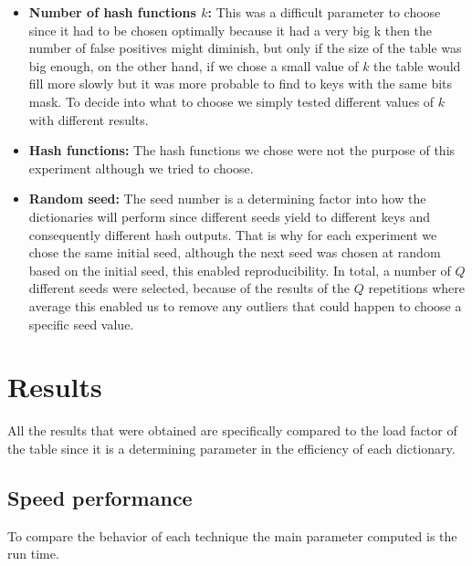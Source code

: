\documentclass{article}
\begin{document}
\begin{itemize}
    \item \textbf{Number of hash functions $k$:}
              This was a difficult parameter to choose since it had to be chosen optimally because it had a very big k then the number of false positives might diminish, but only if the size of the table
             was big enough, on the other hand, if we chose a small value of $k$ the table would fill more slowly but it was more probable to find to keys with the same bits mask. To decide into what to choose 
             we simply tested different values of $k$ with different results. 
             
    \item \textbf{Hash functions:}
            The hash functions we chose were not the purpose of this experiment although we tried to choose. 
            
    \item \textbf{Random seed:}
            The seed number is a determining factor into how the dictionaries will perform since different seeds yield to different keys and consequently different hash outputs. 
            That is why for each experiment we chose the same initial seed, although the next seed was chosen at random based on the initial seed, this enabled reproducibility. In total, a number of $Q$ different seeds were selected, because of the results of the $Q$ repetitions where average this enabled us to remove any outliers that could happen to choose a specific seed value.
    \end{itemize}
    \section{Results}
    All the results that were obtained are specifically compared to the load factor of the table since it is a determining parameter in the efficiency of each dictionary. 

    \subsection*{Speed performance}
   To compare the behavior of each technique the main parameter computed is the run time.
    
\end{document}
